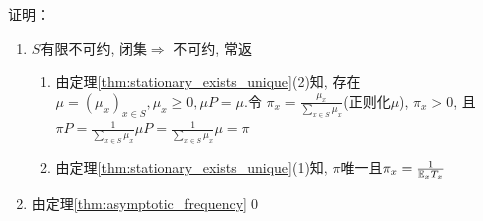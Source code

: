 证明：
\begin{enumerate}
    \item $S$有限不可约, 闭集$\Rightarrow$ 不可约, 常返
    \begin{enumerate}
        \item 由定理\ref{thm:stationary_exists_unique}(2)知, 存在$\mu=(\mu_x)_{x\in S},\mu_x\geq 0, \mu P=\mu$.令 $\pi_x=\frac{\mu_x}{\sum_{x\in S}\mu_x}$(正则化$\mu$), $\pi_x>0$, 且 $\pi P=\frac{1}{\sum_{x\in S}\mu_x}\mu P=\frac{1}{\sum_{x\in S}\mu_x}\mu=\pi$
        \item 由定理\ref{thm:stationary_exists_unique}(1)知, $\pi$唯一且$\pi_x=\frac{1}{\mathbb E_xT_x}$
    \end{enumerate}
    \item 由定理\ref{thm:asymptotic_frequency}\qed
\end{enumerate}